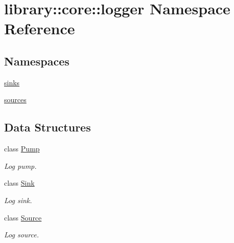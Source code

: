 \hypertarget{namespacelibrary_1_1core_1_1logger}{}\section{library\+:\+:core\+:\+:logger Namespace Reference}
\label{namespacelibrary_1_1core_1_1logger}
\subsection*{Namespaces}
\begin{DoxyCompactItemize}
\item 
 \hyperlink{namespacelibrary_1_1core_1_1logger_1_1sinks}{sinks}
\item 
 \hyperlink{namespacelibrary_1_1core_1_1logger_1_1sources}{sources}
\end{DoxyCompactItemize}
\subsection*{Data Structures}
\begin{DoxyCompactItemize}
\item 
class \hyperlink{classlibrary_1_1core_1_1logger_1_1Pump}{Pump}
\begin{DoxyCompactList}\small\item\em Log pump. \end{DoxyCompactList}\item 
class \hyperlink{classlibrary_1_1core_1_1logger_1_1Sink}{Sink}
\begin{DoxyCompactList}\small\item\em Log sink. \end{DoxyCompactList}\item 
class \hyperlink{classlibrary_1_1core_1_1logger_1_1Source}{Source}
\begin{DoxyCompactList}\small\item\em Log source. \end{DoxyCompactList}\end{DoxyCompactItemize}
